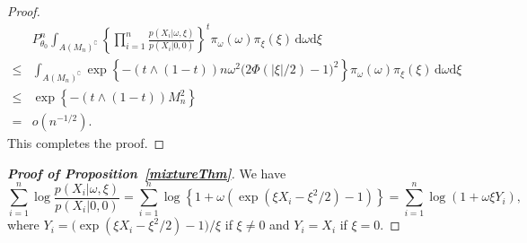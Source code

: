 \documentclass[11pt]{article}
\theoremstyle{plain}
\theoremstyle{definition}
\theoremstyle{remark}
\begin{document}
\begin{appendices}
\begin{proof}
\begin{align*}
    &P^n_{\theta_0} \int_{A(M_n)^\complement} \left\{\prod_{i=1}^n \frac{p(X_i|\omega,\xi)}{p(X_i|0,0)}\right\}^t \pi_{\omega}(\omega)\pi_{\xi}(\xi)\, \mathrm d\omega \mathrm d\xi
\\
    \leq
    &
    \int_{A(M_n)^\complement} \exp \left\{ -(t\wedge (1-t)) n\omega^2 \big( 2\Phi(|\xi|/2)-1\big)^2 \right\}
    \pi_{\omega}(\omega) \pi_\xi(\xi)\, \mathrm d \omega \mathrm d\xi
    \\
    \leq
    &
    \exp \left\{ -(t\wedge (1-t)) M_n^2 \right\}
\\
=&o(n^{-1/2}).
\end{align*}
This completes the proof.

\end{proof}


\begin{proof}[\textbf{Proof of Proposition~\ref{mixtureThm}}]
We have
\begin{equation*}
    \sum_{i=1}^n \log \frac{p(X_i|\omega,\xi)}{ p(X_i|0,0)}
    =\sum_{i=1}^n \log\left\{ 1+\omega \left(\exp(\xi X_i -\xi^2/2)-1\right)\right\}=\sum_{i=1}^n \log(1+\omega \xi Y_i),
\end{equation*}
where
$
Y_i=\big(\exp(\xi X_i -\xi^2/2)-1\big)/\xi
$ if $\xi \neq 0$ and $Y_i=X_i$ if $\xi =0$.


\end{proof}
\end{appendices}
\end{document}
